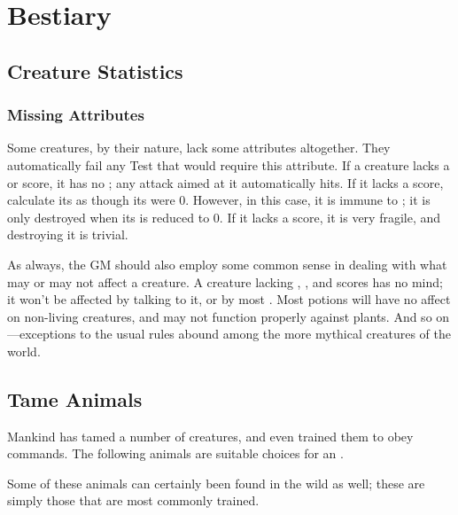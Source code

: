 \chapter{Bestiary}

\section{Creature Statistics}

\subsection{Missing Attributes}

Some creatures, by their nature, lack some attributes altogether.
They automatically fail any Test that would require this attribute.
If a creature lacks a  or  score, it has no ; any attack aimed at it automatically hits.
If it lacks a  score, calculate its  as though its  were 0.
However, in this case, it is immune to {\shock}; it is only destroyed when its  is reduced to 0.
If it lacks a  score, it is very fragile, and destroying it is trivial.

As always, the GM should also employ some common sense in dealing with what may or may not affect a creature.
A creature lacking , , and  scores has no mind; it won't be affected by talking to it, or by most .
Most potions will have no affect on non-living creatures, and may not function properly against plants.
And so on---exceptions to the usual rules abound among the more mythical creatures of the world.

\section{Tame Animals}

Mankind has tamed a number of creatures, and even trained them to obey commands.
The following animals are suitable choices for an .

Some of these animals can certainly been found in the wild as well; these are simply those that are most commonly trained.


